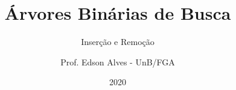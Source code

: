 \title{Árvores Binárias de Busca}
\subtitle{Inserção e Remoção}
\author{Prof. Edson Alves - UnB/FGA}
\date{2020}
